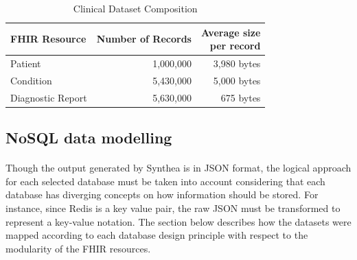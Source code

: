 \documentclass[5p]{elsarticle}
\begin{document}
\begin{table}[!hbp]
    \centering
    \caption[l]{Clinical Dataset Composition}
     \label{table.dataset.composition}
        \begin{tabular}{lrr}
        \toprule
        FHIR Resource & Number of Records & \makecell[c]{Average size \\per record} \\
        \hline
        Patient           & 1,000,000 & 3,980 bytes \\
        Condition         & 5,430,000 & 5,000 bytes \\
        Diagnostic Report & 5,630,000 & 675 bytes \\
        \hline
    \end{tabular}
\end{table}


\subsection{NoSQL data modelling}
\paragraph{} \noindent Though the output generated by Synthea is in JSON format, the logical approach for each selected database must be taken into account considering that each database has diverging concepts on how information should be stored. For instance, since Redis is a key value pair, the raw JSON must be transformed to represent a key-value notation. The section below describes how the datasets were mapped according to each database design principle with respect to the modularity of the FHIR resources.
\end{document}

